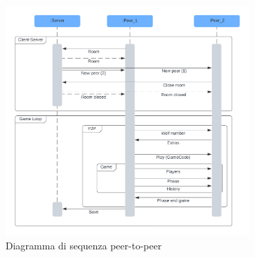 \begin{figure}[H]
\centering
\includegraphics[width=0.83\textwidth]{img/draw/uml_sequence_peer_to_peer.png}
\caption{Diagramma di sequenza peer-to-peer}
\label{fig:peerToPeerSequence}
\end{figure}

